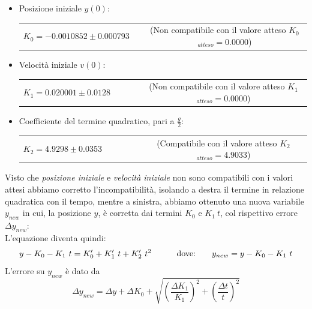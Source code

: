 \documentclass[12pt, a4paper]{article}
\begin{document}
\renewcommand{\theenumii}{\roman{enumii}}  
\begin{itemize}
    \itemsep0em 
    
        \item Posizione iniziale $y(0)$:
        
        \begin{tabular}{ccc}
        {$K_0 = -0.0010852 \pm 0.000793$} & & \small{(Non compatibile con il valore atteso $K_{0}$ $_{atteso}= 0.0000$)}\\
        \end{tabular}
        
    \end{itemize}
    \begin{itemize}
        \item Velocità iniziale $v(0)$:\\
        \begin{tabular}{ccccc}
        {$K_1 =  0.020001 \pm 0.0128$} & & & & \small{(Non compatibile con il valore atteso $K_{1}$ $_{atteso} = 0.0000$)}\\
        \end{tabular}
        
    \end{itemize}
      \begin{itemize}
          \item Coefficiente del termine quadratico, pari a $\displaystyle{\frac{g}{2}}$:\\ 
          \begin{tabular}{cccccc}
              {$K_2 =  4.9298 \pm 0.0353$} & & & & &\small{(Compatibile con il valore atteso $K_{2}$ $_{atteso}= 4.9033$)}\\
          \end{tabular}
         
      \end{itemize}
    \bigskip
Visto che \textit{posizione iniziale} e \textit{velocità iniziale} non sono compatibili con i valori attesi abbiamo corretto l'incompatibilità, isolando a destra il termine in relazione  quadratica con il tempo, mentre a sinistra, abbiamo ottenuto una nuova variabile $y_{new}$ in cui, la posizione $y$, è corretta dai termini $K_0$ e $ K_1\ t$, col rispettivo errore $\Delta y_{new}$: \\
L'equazione diventa quindi:
\begin{equation*}
\begin{aligned}
  & & y - K_0 - K_1\ t = K_0'+K_1'\ t+K_{2}'\ t^2
  &\quad{} 
  \end{aligned}
  \begin{aligned}
  & &\text{dove:\phantom{.......}} y_{new} = y - K_0 - K_1\ t 
  &
  \end{aligned}
\end{equation*}
L'errore su  $y_{new}$ è dato da
\begin{equation*}
 \Delta y_{new} = \Delta y + \Delta K_0 + \sqrt{\left(\frac{\Delta K_1}{K_1}\right)^2 + \left(\frac{\Delta t}{t}\right)^2}
 \end{equation*}
\end{document}
